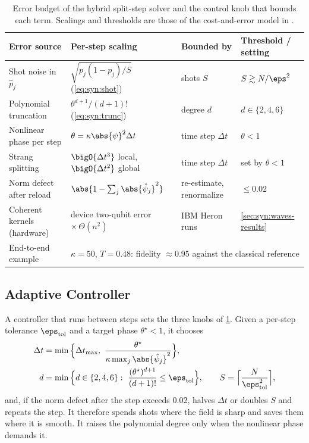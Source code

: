 \begin{table}[htbp]
\caption{Error budget of the hybrid split-step solver and the control knob that bounds each term. Scalings and thresholds are those of the cost-and-error model in \cite{guo2026nonlinearwaves}.}
\label{tab:syn:errorbudget}
\centering\footnotesize
\begin{tabularx}{\textwidth}{@{}p{3.0cm} X p{2.5cm} p{2.9cm}@{}}
\toprule
Error source & Per-step scaling & Bounded by & Threshold / setting \\
\midrule
Shot noise in $\hat p_j$ & $\sqrt{p_j(1-p_j)/S}$ (\cref{eq:syn:shot}) & shots $S$ & $S\gtrsim N/\eps^{2}$ \\
Polynomial truncation & $\theta^{d+1}/(d+1)!$ (\cref{eq:syn:trunc}) & degree $d$ & $d\in\{2,4,6\}$ \\
Nonlinear phase per step & $\theta=\kappa\abs{\psi}^{2}\Delta t$ & time step $\Delta t$ & $\theta<1$ \\
Strang splitting & $\bigO{\Delta t^{3}}$ local, $\bigO{\Delta t^{2}}$ global & time step $\Delta t$ & set by $\theta<1$ \\
Norm defect after reload & $\abs{1-\sum_j\abs{\hat\psi_j}^{2}}$ & re-estimate, renormalize & $\le 0.02$ \\
Coherent kernels (hardware) & device two-qubit error $\times\,\Theta(n^{2})$ & IBM Heron runs & \cref{sec:syn:waves-results} \\
\midrule
End-to-end example & \multicolumn{3}{l}{$\kappa=50$, $T=0.48$: fidelity $\approx 0.95$ against the classical reference} \\
\bottomrule
\end{tabularx}
\end{table}

\subsection{Adaptive Controller}\label{sec:syn:controller}

A controller that runs between steps sets the three knobs of \cref{tab:syn:errorbudget}. Given a per-step tolerance $\eps_{\mathrm{tol}}$ and a target phase $\theta^{\star}<1$, it chooses
\begin{equation}\label{eq:syn:controller}
\begin{aligned}
  \Delta t&=\min\Big\{\Delta t_{\max},\ \frac{\theta^{\star}}{\kappa\max_j\abs{\hat\psi_j}^{2}}\Big\},\\
  d&=\min\Big\{d\in\{2,4,6\}:\ \frac{(\theta^{\star})^{d+1}}{(d+1)!}\le\eps_{\mathrm{tol}}\Big\},\qquad
  S=\Big\lceil\frac{N}{\eps_{\mathrm{tol}}^{2}}\Big\rceil,
\end{aligned}
\end{equation}
and, if the norm defect after the step exceeds $0.02$, halves $\Delta t$ or doubles $S$ and repeats the step. It therefore spends shots where the field is sharp and saves them where it is smooth. It raises the polynomial degree only when the nonlinear phase demands it.

